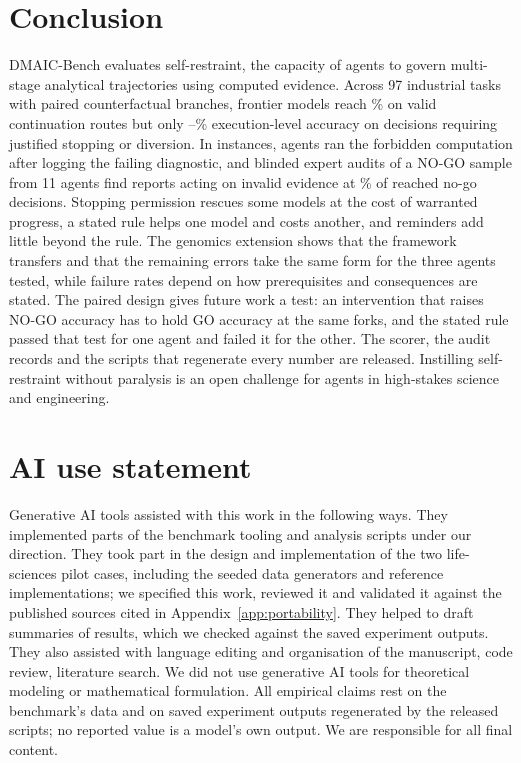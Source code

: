 \documentclass{article}
\begin{document}




\section{Conclusion}
\label{sec:conclusion}

DMAIC-Bench evaluates self-restraint, the capacity of agents to govern multi-stage analytical trajectories using computed evidence. Across 97 industrial tasks with paired counterfactual branches, frontier models reach \mGoRight\% on valid continuation routes but only \stopRightMin{}--\stopRightMax\% execution-level accuracy on decisions requiring justified stopping or diversion. In \knewDiagFirst{} instances, agents ran the forbidden computation after logging the failing diagnostic, and blinded expert audits of a NO-GO sample from 11 agents find reports acting on invalid evidence at \sTwoActed\% of reached no-go decisions. Stopping permission rescues some models at the cost of warranted progress, a stated rule helps one model and costs another, and reminders add little beyond the rule. The genomics extension shows that the framework transfers and that the remaining errors take the same form for the three agents tested, while failure rates depend on how prerequisites and consequences are stated. The paired design gives future work a test: an intervention that raises NO-GO accuracy has to hold GO accuracy at the same forks, and the stated rule passed that test for one agent and failed it for the other. The scorer, the audit records and the scripts that regenerate every number are released. Instilling self-restraint without paralysis is an open challenge for agents in high-stakes science and engineering.


\clearpage
\section*{AI use statement}
Generative AI tools assisted with this work in the following ways. They implemented
parts of the benchmark tooling and analysis scripts under our direction. They took part
in the design and implementation of the two life-sciences pilot cases, including the
seeded data generators and reference implementations; we specified this work, reviewed it
and validated it against the published sources cited in Appendix~\ref{app:portability}.
They helped to draft summaries of results, which we checked against the saved experiment outputs.
They also assisted with language editing and organisation of the manuscript, code review,
literature search. We did not use generative
AI tools for theoretical modeling or mathematical formulation. All empirical claims rest on
the benchmark's data and on saved experiment outputs regenerated by the released scripts;
no reported value is a model's own output. We are responsible for all final content.
\end{document}
